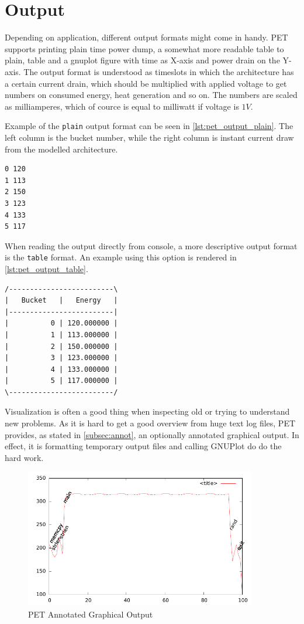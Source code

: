 \section{Output}
Depending on application, different output formats might come in handy. PET
supports printing plain time power dump, a somewhat more readable table to
plain, table and a gnuplot figure with time as X-axis and power drain on the
Y-axis. The output format is understood as timeslots in which the architecture
has a certain current drain, which should be multiplied with applied voltage to
get numbers on consumed energy, heat generation and so on. The numbers are
scaled as milliamperes, which of cource is equal to milliwatt if voltage is
$1V$.

Example of the \texttt{plain} output format can be seen in
\autoref{lst:pet_output_plain}. The left column is the bucket number, while the
right column is instant current draw from the modelled architecture.

\begin{lstlisting}[label={lst:pet_output_plain},caption={PET Plain Output}]
0 120
1 113
2 150
3 123
4 133
5 117
\end{lstlisting}

When reading the output directly from console, a more descriptive output format
is the \texttt{table} format. An example using this option is rendered in
\autoref{lst:pet_output_table}.

\begin{lstlisting}[label={lst:pet_output_table},caption={PET Table Output}]
/-------------------------\
|   Bucket   |   Energy   |
|-------------------------|
|          0 | 120.000000 |
|          1 | 113.000000 |
|          2 | 150.000000 |
|          3 | 123.000000 |
|          4 | 133.000000 |
|          5 | 117.000000 |
\-------------------------/
\end{lstlisting}

Visualization is often a good thing when inspecting old or trying to understand
new problems. As it is hard to get a good overview from huge text log files, PET
provides, as stated in \autoref{subsec:annot}, an optionally annotated graphical
output. In effect, it is formatting temporary output files and calling GNUPlot
do do the hard work.

\begin{figure}
    \includegraphics[width=0.9\textwidth]{figs/annot.pdf}
    \caption{PET Annotated Graphical Output}
    \label{fig:annot}
\end{figure}

